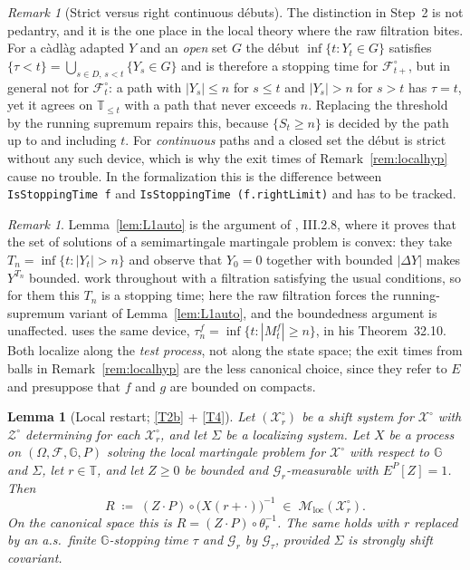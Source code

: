 \documentclass[11pt,a4paper]{article}
\theoremstyle{plain}
\newtheorem{lemma}[theorem]{Lemma}
\theoremstyle{definition}
\theoremstyle{remark}
\newtheorem{remark}[theorem]{Remark}
\newcommand{\T}{\mathbb{T}}                     %
\newcommand{\Filt}{\mathcal{F}}
\newcommand{\Gilt}{\mathcal{G}}
\newcommand{\XX}{\mathcal{X}}                  %
\newcommand{\ZZ}{\mathcal{Z}}                  %
\newcommand{\Msol}{\mathcal{M}}
\newcommand{\KA}{\cite{Kal21}}
\newcommand{\JS}{\cite{JS03}}
\begin{document}
\begin{remark}[Strict versus right continuous d\'ebuts]
  \label{rem:strictdebut}
  The distinction in Step~2 is not pedantry, and it is the one place in the local
  theory where the raw filtration bites.  For a c\`adl\`ag adapted $Y$ and an
  \emph{open} set $G$ the d\'ebut $\inf\{t : Y_t \in G\}$ satisfies
  $\{\tau < t\} = \bigcup_{s \in D,\, s<t} \{Y_s \in G\}$ and is therefore a
  stopping time for $\Filt^\circ_{t+}$, but in general not for $\Filt^\circ_t$: a
  path with $|Y_s| \leq n$ for $s \leq t$ and $|Y_s| > n$ for $s > t$ has
  $\tau = t$, yet it agrees on $\T_{\leq t}$ with a path that never exceeds $n$.
  Replacing the threshold by the running supremum repairs this, because
  $\{S_t \geq n\}$ is decided by the path up to and including $t$.  For
  \emph{continuous} paths and a closed set the d\'ebut is strict without any such
  device, which is why the exit times of Remark~\ref{rem:localhyp} cause no
  trouble.  In the formalization this is the difference between
  \texttt{IsStoppingTime f} and \texttt{IsStoppingTime (f.rightLimit)} and has to
  be tracked.
\end{remark}

\begin{remark}
  \label{rem:L1sources}
  Lemma~\ref{lem:L1auto} is the argument of \JS, III.2.8, where it proves that
  the set of solutions of a semimartingale martingale problem is convex: they
  take $T_n = \inf\{t : |Y_t| > n\}$ and observe that $Y_0 = 0$ together with
  bounded $|\Delta Y|$ makes $Y^{T_n}$ bounded.  \JS{} work throughout with a
  filtration satisfying the usual conditions, so for them this $T_n$ is a
  stopping time; here the raw filtration forces the running-supremum variant of
  Lemma~\ref{lem:L1auto}, and the boundedness argument is unaffected.  \KA{} uses the same device,
  $\tau^f_n = \inf\{t : |M^f_t| \geq n\}$, in his Theorem~32.10.  Both localize
  along the \emph{test process}, not along the state space; the exit times from
  balls in Remark~\ref{rem:localhyp} are the less canonical choice, since they
  refer to $E$ and presuppose that $f$ and $g$ are bounded on compacts.
\end{remark}

\begin{lemma}[Local restart; \eqref{T2b} + \eqref{T4}]
  \label{lem:localrestart}
  Let $(\XX^\circ_r)$ be a shift system for $\XX^\circ$ with $\ZZ^\circ$
  determining for each $\XX^\circ_r$, and let $\Sigma$ be a localizing system.
  Let $X$ be a process on $(\Omega,\Filt,\mathbb{G},P)$ solving the local martingale
  problem for $\XX^\circ$ with respect to $\mathbb{G}$ and $\Sigma$, let $r \in \T$, and
  let $Z \geq 0$ be \emph{bounded} and $\Gilt_r$-measurable with $E^P[Z] = 1$.
  Then
  \[
    R \;\coloneqq\; (Z \cdot P) \circ \bigl( X(r+\cdot) \bigr)^{-1}
      \;\in\; \Msol_{\mathrm{loc}}(\XX^\circ_r) .
  \]
  On the canonical space this is $R = (Z \cdot P) \circ \theta_r^{-1}$.  The same
  holds with $r$ replaced by an a.s.\ finite $\mathbb{G}$-stopping time $\tau$ and
  $\Gilt_r$ by $\Gilt_\tau$, provided $\Sigma$ is strongly shift covariant.
\end{lemma}
\end{document}
